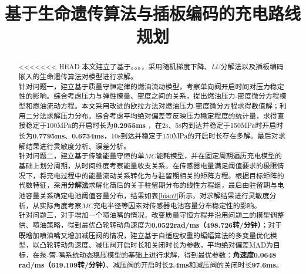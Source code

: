 \documentclass{whutmod}
\title{基于生命遗传算法与插板编码的充电路线规划}
\begin{document}
	\maketitle
	\thispagestyle{empty}
	\begin{abstract}
<<<<<<< HEAD
		本文建立了基于。。。，采用随机梯度下降、$LU$分解法以及插板编码嵌入的生命遗传算法对模型进行求解。\\
	
		针对问题一，建立基于质量守恒定律的燃油流动模型，考察单向阀开启时间对压力稳定性的影响。综合考虑压力与弹性模量、密度之间的关系，提出燃油压力-密度微分方程模型和燃油流动方程。本文采用改进的欧拉方法对燃油压力-密度微分方程求得数值解；利用二分法求解压力分布。综合考虑平均绝对偏差等反映压力稳定程度的统计量，求得直接稳定于100MPa的开启时长为\textbf{0.2955ms} ，在2s、5s内到达并稳定于150MPa时开启时长为\textbf{0.7795ms}、\textbf{0.6734ms}，10s到达并稳定于150MPa的开启时长存在多解。最后对求解结果进行灵敏度分析、误差分析。\\
		
		针对问题二，建立基于传输能量守恒的单$MC$能耗模型，并在固定周期遍历充电模型的基础上划分周期，从时间维度考察能量收支关系。在传感器电量满足阈值要求的极限情况下，将充电过程中的能量流动关系转化为与驻留期相关的矩阵方程。根据目标矩阵的代数特征，采用\textbf{分解法}求解化简后的关于驻留期分布的线性方程组，最后由驻留期与电池容量关系确定电池阈值容量分布，结果如表\ref{biao2}所示。对求解结果进行灵敏度分析，从实际角度考察$MC$充电半径等因素对传感器电池容量分布稳定性的影响。\\
			
		针对问题三，对于增加一个喷油嘴的情况，改变质量守恒方程并沿用问题二的模型调整供、喷油策略，得到最优凸轮转动角速度为\textbf{0.0522rad/ms（498.726转/分钟）}；对于既增加喷油嘴又增加减压阀的情况，建立基于自适应权重的蝙蝠算法的多变量优化模型，以凸轮转动角速度、减压阀开启时长和关闭时长为参数，平均绝对偏差MAD为目标，在泵-管-嘴系统动态稳压模型的基础上进行求解，得到最优参数：\textbf{角速度0.0648 rad/ms（619.109转/分钟）}、减压阀的开启时长\textbf{2.4ms}和减压阀的关闭时长\textbf{97.6ms}。\\
		

\end{abstract}
\end{document}
